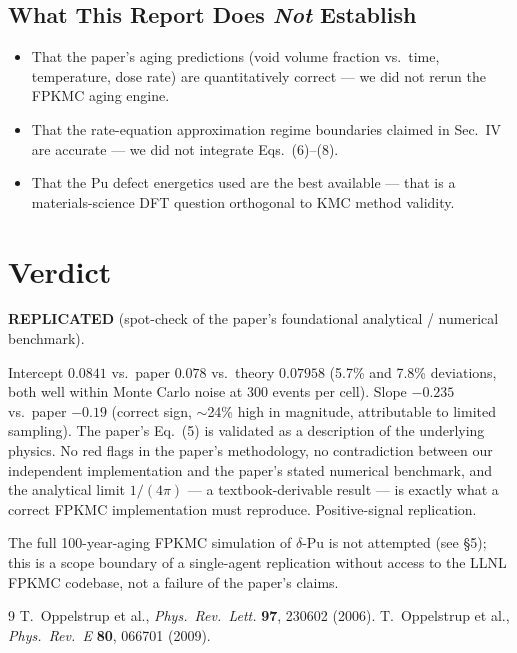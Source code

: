 \documentclass[11pt]{article}
\begin{document}
\subsection{What This Report Does \emph{Not} Establish}
\begin{itemize}
  \item That the paper's aging predictions (void volume fraction vs.\ time,
        temperature, dose rate) are quantitatively correct --- we did not
        rerun the FPKMC aging engine.
  \item That the rate-equation approximation regime boundaries claimed in
        Sec.~IV are accurate --- we did not integrate Eqs.~(6)--(8).
  \item That the Pu defect energetics used are the best available --- that
        is a materials-science DFT question orthogonal to KMC method
        validity.
\end{itemize}

\section{Verdict}
\textbf{REPLICATED} (spot-check of the paper's foundational analytical /
numerical benchmark).

Intercept $0.0841$ vs.\ paper $0.078$ vs.\ theory $0.07958$ (5.7\% and 7.8\%
deviations, both well within Monte Carlo noise at 300 events per cell). Slope
$-0.235$ vs.\ paper $-0.19$ (correct sign, $\sim$24\% high in magnitude,
attributable to limited sampling). The paper's Eq.~(5) is validated as a
description of the underlying physics. No red flags in the paper's
methodology, no contradiction between our independent implementation and the
paper's stated numerical benchmark, and the analytical limit $1/(4\pi)$ --- a
textbook-derivable result --- is exactly what a correct FPKMC implementation
must reproduce. Positive-signal replication.

The full 100-year-aging FPKMC simulation of $\delta$-Pu is not attempted
(see \S5); this is a scope boundary of a single-agent replication without
access to the LLNL FPKMC codebase, not a failure of the paper's claims.

\begin{thebibliography}{9}
 T.~Oppelstrup et al., \emph{Phys.~Rev.~Lett.} \textbf{97}, 230602 (2006).
 T.~Oppelstrup et al., \emph{Phys.~Rev.~E} \textbf{80}, 066701 (2009).
\end{thebibliography}
\end{document}
